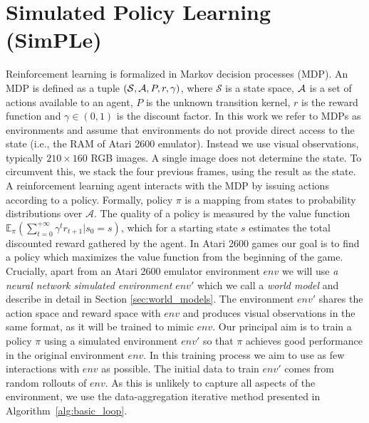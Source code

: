 \section{Simulated Policy Learning (SimPLe)}
\label{subsec:model}
\label{sec:mbrl}


Reinforcement learning is formalized in Markov decision processes (MDP). An MDP is defined as a tuple $(\mathcal{S}, {\mathcal A}, P, r, \gamma)$, where $\mathcal{S}$ is a state space, ${\mathcal A}$ is a set of actions available to an agent, $P$ is the unknown transition kernel, $r$ is the reward function and $\gamma\in (0,1)$ is the discount factor. 
In this work we refer to MDPs as environments and assume %
that environments do not provide direct access to the state (i.e., the RAM of Atari 2600 emulator). Instead we use visual observations, typically $210\times 160$ RGB images. A single image does not determine the state. To circumvent this, we stack the four previous frames, using the result as the state.
A reinforcement learning agent interacts with the MDP by issuing actions according to a policy. Formally, policy $\pi$ is a mapping from states to probability distributions over $\mathcal{A}$. The quality of a policy is measured by the value function $\mathbb{E}_{\pi}\left(\sum_{t=0}^{+\infty}\gamma^t r_{t+1}|s_0=s \right)$, which for a starting state $s$ estimates the total discounted reward gathered by the agent. In Atari 2600 games our goal is to find a policy which maximizes the value function from the beginning of the game.
Crucially, apart from an Atari 2600 emulator environment $env$ we will use \textit{a neural network simulated environment} $env'$ which we call a \textit{world model} and describe in detail in Section \ref{sec:world_models}. The environment $env'$ shares the action space and reward space with $env$ and produces visual observations in the same format, as it will be trained to mimic $env$.  Our principal aim is to
train a policy $\pi$ using a simulated environment $env'$ so that $\pi$ achieves good performance in the original environment $env$. In this training process we aim to use as few interactions with $env$ as possible. 
The initial data to train $env'$ comes from random rollouts of $env$. As this is unlikely to capture all aspects of the environment, we use the data-aggregation iterative method presented in Algorithm~\ref{alg:basic_loop}.
